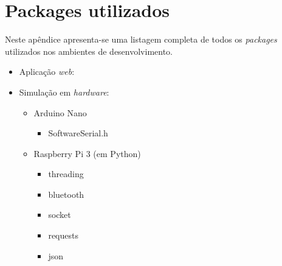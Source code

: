 \chapter{Packages utilizados}
\label{espcifAPIREST}


Neste apêndice apresenta-se uma listagem completa de todos os \textit{packages} utilizados nos ambientes de desenvolvimento. 


\begin{itemize}
	\item Aplicação \textit{web}: 
	
	\item Simulação em \textit{hardware}: 
	\begin{itemize}
		\item Arduino Nano 
		
		\begin{itemize}
			\item SoftwareSerial.h
		\end{itemize}
		
		
		\item Raspberry Pi 3 (em Python)
		
		\begin{itemize}
			\item threading
			\item bluetooth
			\item socket
			\item requests
			\item json
		\end{itemize}
		
	\end{itemize}
	
	


	
\end{itemize}
